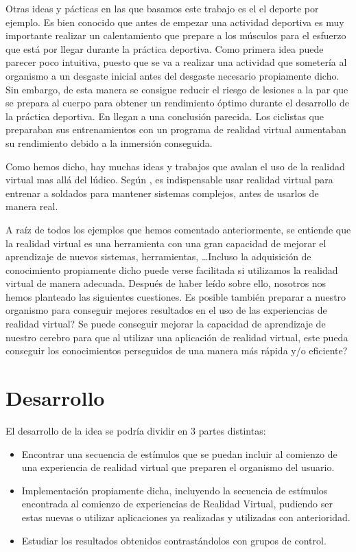 \documentclass[twoside,twocolumn]{article}
\begin{document}
Otras ideas y p\'acticas en las que basamos este trabajo es el el deporte por ejemplo. Es bien conocido que antes de empezar una actividad deportiva es muy importante realizar un calentamiento que prepare a los m\'usculos para el esfuerzo que est\'a por llegar durante la pr\'actica deportiva. Como primera idea puede parecer poco intuitiva, puesto que se va a realizar una actividad que someter\'ia al organismo a un desgaste inicial antes del desgaste necesario propiamente dicho. Sin embargo, de esta manera se consigue reducir el riesgo de lesiones a la par que se prepara al cuerpo para obtener un rendimiento \'optimo durante el desarrollo de la pr\'actica deportiva. En \cite{Preparation} llegan a una conclusi\'on parecida. Los ciclistas que preparaban sus entrenamientos con un programa de realidad virtual aumentaban su rendimiento debido a la inmersi\'on conseguida.

Como hemos dicho, hay muchas ideas y trabajos que avalan el uso de la realidad virtual mas all\'a del l\'udico. Seg\'un \cite{Army}, es indispensable usar realidad virtual para entrenar a soldados para mantener sistemas complejos, antes de usarlos de manera real.

A raíz de todos los ejemplos que hemos comentado anteriormente, se entiende que la realidad virtual es una herramienta con una gran capacidad de mejorar el aprendizaje de nuevos sistemas, herramientas, \ldots Incluso la adquisici\'on de conocimiento propiamente dicho puede verse facilitada si utilizamos la realidad virtual de manera adecuada. Despu\'es de haber le\'ido sobre ello, nosotros nos hemos planteado las siguientes cuestiones. Es posible tambi\'en preparar a nuestro organismo para conseguir mejores resultados en el uso de las experiencias de realidad virtual? Se puede conseguir mejorar la capacidad de aprendizaje de nuestro cerebro para que al utilizar una aplicaci\'on de realidad virtual, este pueda conseguir los conocimientos perseguidos de una manera m\'as r\'apida y/o eficiente?


\section{Desarrollo}
El desarrollo de la idea se podr\'ia dividir en 3 partes distintas:

\begin{itemize}
\item Encontrar una secuencia de est\'imulos que se puedan incluir al comienzo de una experiencia de realidad virtual que preparen el organismo del usuario.
\item Implementaci\'on propiamente dicha, incluyendo la secuencia de est\'i­mulos encontrada al comienzo de experiencias de Realidad Virtual, pudiendo ser estas nuevas o utilizar aplicaciones ya realizadas y utilizadas con anterioridad.
\item Estudiar los resultados obtenidos contrast\'andolos con grupos de control.
\end{itemize}
\end{document}
